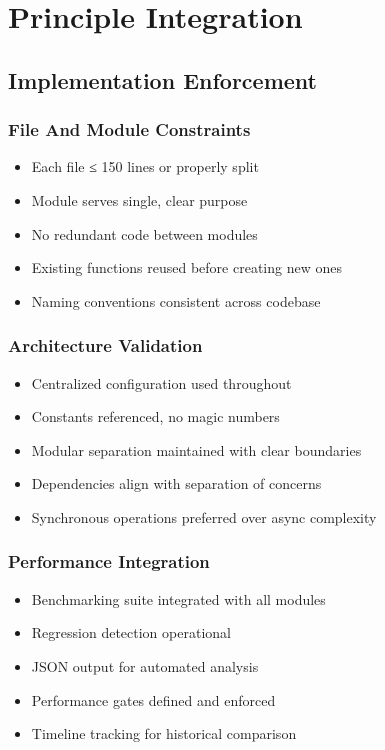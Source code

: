 \documentclass{article}
\begin{document}
\section{Principle Integration}

\subsection{Implementation Enforcement}

\subsubsection{File And Module Constraints}
\begin{itemize}[noitemsep]
\item Each file ≤ 150 lines or properly split
\item Module serves single, clear purpose
\item No redundant code between modules
\item Existing functions reused before creating new ones
\item Naming conventions consistent across codebase
\end{itemize}

\subsubsection{Architecture Validation}
\begin{itemize}[noitemsep]
\item Centralized configuration used throughout
\item Constants referenced, no magic numbers
\item Modular separation maintained with clear boundaries
\item Dependencies align with separation of concerns
\item Synchronous operations preferred over async complexity
\end{itemize}

\subsubsection{Performance Integration}
\begin{itemize}[noitemsep]
\item Benchmarking suite integrated with all modules
\item Regression detection operational
\item JSON output for automated analysis
\item Performance gates defined and enforced
\item Timeline tracking for historical comparison
\end{itemize}
\end{document}

